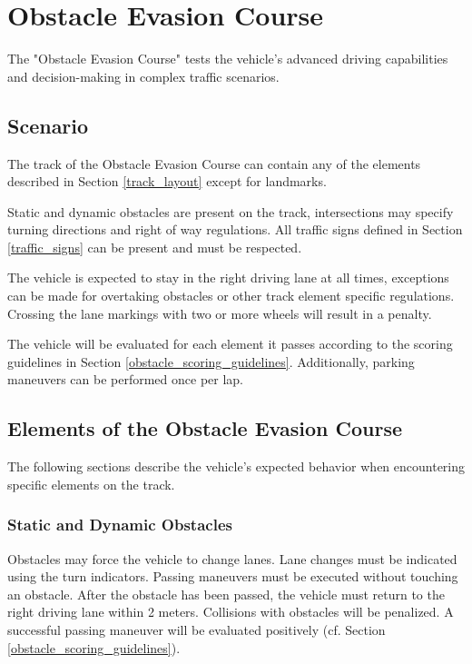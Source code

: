 \newpage

\section{Obstacle Evasion Course}
\label{obstacle_course}

The "Obstacle Evasion Course" tests the vehicle's advanced driving capabilities and decision-making in complex traffic scenarios.

\subsection{Scenario}

The track of the Obstacle Evasion Course can contain any of the elements described in Section \ref{track_layout} except for landmarks.

Static and dynamic obstacles are present on the track, intersections may specify turning directions and right of way regulations.
All traffic signs defined in Section \ref{traffic_signs} can be present and must be respected.

The vehicle is expected to stay in the right driving lane at all times, exceptions can be made for overtaking obstacles or other track element specific regulations.
Crossing the lane markings with two or more wheels will result in a penalty.

The vehicle will be evaluated for each element it passes according to the scoring guidelines in Section \ref{obstacle_scoring_guidelines}.
Additionally, parking maneuvers can be performed once per lap.

\subsection{Elements of the Obstacle Evasion Course}
\label{elements_obstacle_evasion}

The following sections describe the vehicle's expected behavior when encountering specific elements on the track.

\subsubsection{Static and Dynamic Obstacles}
\label{obstacle_course_obstacles}

Obstacles may force the vehicle to change lanes.
Lane changes must be indicated using the turn indicators.
Passing maneuvers must be executed without touching an obstacle.
After the obstacle has been passed, the vehicle must return to the right driving lane within 2 meters.
Collisions with obstacles will be penalized.
A successful passing maneuver will be evaluated positively (cf. Section \ref{obstacle_scoring_guidelines}).

